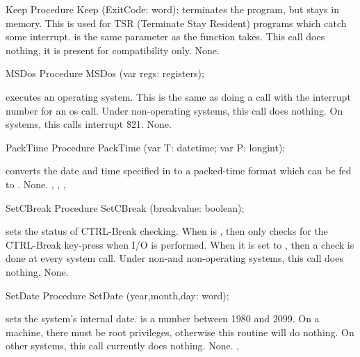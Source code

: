 \begin{procedure}{Keep}
\Declaration
Procedure Keep (ExitCode: word);
\Description
{} terminates the program, but stays in memory. This is used for TSR
(Terminate Stay Resident) programs which catch some interrupt.
 is the same parameter as the  function takes.
\Portability
This call does nothing, it is present for compatibility only.
\Errors
None.
\SeeAlso
{}
\end{procedure}
\begin{procedure}{MSDos}
\Declaration
Procedure MSDos (var regs: registers);
\Description

 executes an operating system. This is the same as doing a
 call with the interrupt number for an os call.
\Portability
Under non-\dos operating systems, this call does nothing. On \dos systems,
this calls interrupt \$21.
\Errors
None.
\SeeAlso
{}
\end{procedure}
\begin{procedure}{PackTime}
\Declaration
Procedure PackTime (var T: datetime; var P: longint);
\Description

 converts the date and time specified in 
to a packed-time format which can be fed to .
\Errors
None.
\SeeAlso
{}, , , 
\end{procedure}


\begin{procedure}{SetCBreak}
\Declaration
Procedure SetCBreak (breakvalue: boolean);
\Description

 sets the status of CTRL-Break checking. When 
 is , then \dos only checks for the CTRL-Break 
key-press when I/O is performed. When it is set to , then a 
check is done at every system call.
\Portability
Under non-\dos and non-\amiga operating systems, this call does nothing.
\Errors
None.
\SeeAlso
{}
\end{procedure}
\begin{procedure}{SetDate}
\Declaration
Procedure SetDate (year,month,day: word);
\Description

 sets the system's internal date.  is a number
between 1980 and 2099.
\Portability
On a \linux machine, there must be root privileges, otherwise this
routine will do nothing. On other \unix systems, this call currently
does nothing.
\Errors
None.
\SeeAlso
{},
\end{procedure}


